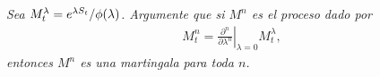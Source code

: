 \emph{
	Sea $M^\lambda_t=e^{\lambda S_t}/\phi\!\left( \lambda\right) $. Argumente que si $M^n$ es el proceso dado por
	\null
	\begin{align}
		M^n_t=\left.\frac{\partial^n}{\partial \lambda^n}\right|_{\lambda=0}M^\lambda_t,
	\end{align}
	\null
	entonces $M^n$ es una martingala para toda $n$.
}

\afterstatement\par\null